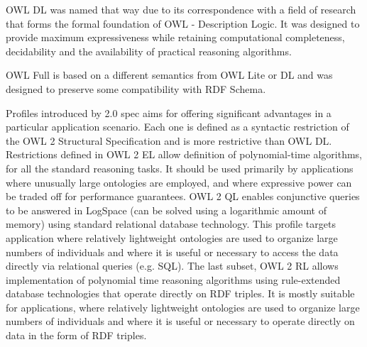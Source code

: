 OWL DL was named that way due to its correspondence with a field of research that forms the formal foundation of OWL - Description Logic. It was designed to provide maximum expressiveness while retaining computational completeness, decidability and the availability of practical reasoning algorithms.

OWL Full is based on a different semantics from OWL Lite or DL and was designed to preserve some compatibility with RDF Schema.

Profiles introduced by 2.0 spec aims for offering significant advantages in a particular application scenario. Each one is defined as a syntactic restriction of the OWL 2 Structural Specification and is more restrictive than OWL DL. Restrictions defined in OWL 2 EL allow definition of polynomial-time algorithms, for all the standard reasoning tasks. It should be used primarily by applications where unusually large ontologies are employed, and where expressive power can be traded off for performance guarantees. OWL 2 QL enables conjunctive queries to be answered in LogSpace (can be solved using a logarithmic amount of memory) using standard relational database technology. This profile targets application where relatively lightweight ontologies are used to organize large numbers of individuals and where it is useful or necessary to access the data directly via relational queries (e.g. SQL). The last subset, OWL 2 RL allows implementation of polynomial time reasoning algorithms using rule-extended database technologies that operate directly on RDF triples. It is mostly suitable for applications, where relatively lightweight ontologies are used to organize large numbers of individuals and where it is useful or necessary to operate directly on data in the form of RDF triples.